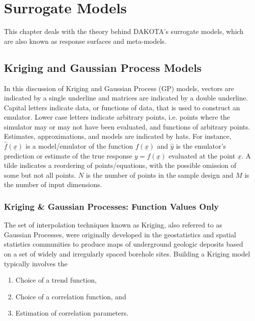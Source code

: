\chapter{Surrogate Models}\label{Chap:SurMod}
This chapter deals with the theory behind DAKOTA's surrogate models, which 
are also known as response surfaces and meta-models.

\section{Kriging and Gaussian Process Models}\label{Sec:KrigGP}

In this discussion of Kriging and Gaussian Process (GP) models, vectors are 
indicated by a single underline and matrices are indicated by a double 
underline.  Capital 
letters indicate data, or functions of data, that is used to construct 
an emulator.  Lower case letters indicate arbitrary points, i.e. points
 where the simulator may or may not have been evaluated, and functions 
of arbitrary points. Estimates, approximations, and models are indicated 
by hats.  For instance, $\hat{f}\left(\underline{x}\right)$ is a 
model/emulator of the function $f\left(\underline{x}\right)$ and 
$\hat{y}$ is the emulator's prediction or estimate of the true response 
$y=f(\underline{x})$ evaluated at the point $\underline{x}$.  A tilde 
indicates a reordering of points/equations, with the possible omission of 
some but not all points. $N$ is the number of points in the sample design 
and $M$ is the number of input dimensions.

\subsection{Kriging \& Gaussian Processes: Function Values Only}
\label{SubSec:KrigGP}
The set of interpolation techniques known as Kriging, also referred to 
as Gaussian Processes, were originally developed in the geostatistics 
and spatial statistics communities to produce maps of underground 
geologic deposits based on a set of widely and irregularly spaced 
borehole sites\cite{Cre91}. Building a Kriging
model typically involves the
\begin{enumerate}
\item Choice of a trend function,
\item Choice of a correlation function, and
\item Estimation of correlation parameters.
\end{enumerate}

